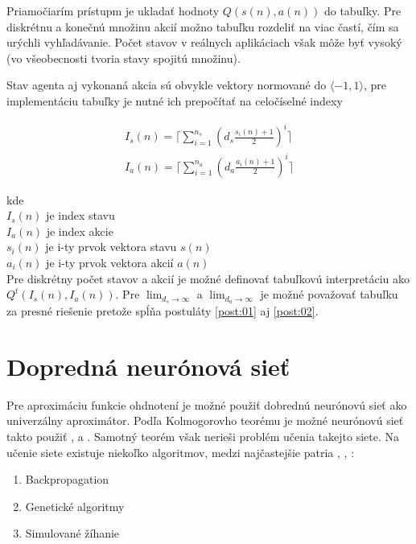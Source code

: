 Priamočiarím prístupm je ukladať hodnoty $Q(s(n), a(n))$ do tabuľky. Pre
diskrétnu a konečnú množinu akcií možno tabuľku rozdeliť na viac častí,
čím sa urýchli vyhľadávanie. Počet stavov v reálnych aplikáciach však môže byť
vysoký (vo všeobecnosti tvoria stavy spojitú množinu).

Stav agenta aj vykonaná akcia sú obvykle vektory normované do $\langle -1, 1 \rangle$,
pre implementáciu tabuľky je nutné ich prepočítať na celočíselné indexy

\begin{align}
  I_s(n) = \lceil \sum\limits_{i=1}^{n_s} {\left( d_s\frac{s_i(n) + 1}{2} \right)^i \rceil}  \\
  I_a(n) = \lceil \sum\limits_{i=1}^{n_a} {\left( d_a\frac{a_i(n) + 1}{2} \right)^i \rceil}
\end{align}

kde \\
$I_s(n)$ je index stavu \\
$I_a(n)$ je index akcie \\
$s_i(n)$ je i-ty prvok vektora stavu $s(n)$ \\
$a_i(n)$ je i-ty prvok vektora akcií $a(n)$ \\

Pre diskrétny počet stavov a akcií je možné definovať tabuľkovú interpretáciu ako
$Q^t(I_s(n), I_a(n))$.
Pre $\lim_{d_s\to\infty}$ a $\lim_{d_a\to\infty}$ je možné považovať tabuľku za presné riešenie
pretože spĺňa postuláty \ref{post:01} aj \ref{post:02}.

\section{Dopredná neurónová sieť}

Pre aproximáciu funkcie ohdnotení je možné použiť dobrednú neurónovú sieť ako
univerzálny aproximátor. Podľa Kolmogorovho teorému je možné neurónovú sieť
takto použiť \cite{bib:kolomongorov_01}, \cite{bib:kolomongorov_02} a \cite{bib:kolomongorov_03}.
Samotný teorém však nerieši problém učenia takejto siete. Na učenie siete
existuje niekoľko algoritmov, medzi najčastejšie patria
\cite{bib:backpropagation_00}, \cite{bib:backpropagation_01}, \cite{bib:backpropagation_02} :

\begin{enumerate}
 \item Backpropagation
 \item Genetické algoritmy
 \item Simulované žíhanie
\end{enumerate}

